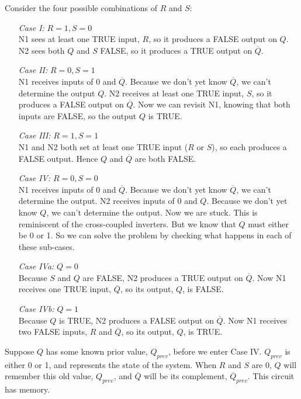 \documentclass[12pt]{article}
\theoremstyle{definition}
\begin{document}
  Consider the four possible combinations of $R$ and $S$:
  \begin{itemize}
    \item[\emph{Case I:}] $R = 1, S = 0$ \\
    N1 sees at least one TRUE input, $R$, so it produces a FALSE output on $Q$. N2 sees both $Q$ and $S$ FALSE, so it produces a TRUE output on $\overline{Q}$.
    \item[\emph{Case II:}] $R = 0, S = 1$ \\
    N1 receives inputs of 0 and $\overline{Q}$. Because we don't yet know $\overline{Q}$, we can't determine the output $Q$. N2 receives at least one TRUE input, $S$, so it produces a FALSE output on $\overline{Q}$. Now we can revisit N1, knowing that both inputs are FALSE, so the output $Q$ is TRUE.
    \item[\emph{Case III:}] $R = 1, S = 1$ \\
    N1 and N2 both set at least one TRUE input ($R$ or $S$), so each produces a FALSE output. Hence $Q$ and $\overline{Q}$ are both FALSE.
    \item[\emph{Case IV:}] $R = 0, S = 0$ \\
    N1 receives inputs of 0 and $\overline{Q}$. Because we don't yet know $\overline{Q}$, we can't determine the output. N2 receives inputs of 0 and $Q$. Because we don't yet know $Q$, we can't determine the output. Now we are stuck. This is reminiscent of the cross-coupled inverters. But we know that $Q$ must either be 0 or 1. So we can solve the problem by checking what happens in each of these sub-cases.
    \item[\emph{Case IVa:}] $Q = 0$ \\
    Because $S$ and $Q$ are FALSE, N2 produces a TRUE output on $\overline{Q}$. Now N1 receives one TRUE input, $\overline{Q}$, so its output, $Q$, is FALSE.
    \item[\emph{Case IVb:}] $Q = 1$ \\
    Because $Q$ is TRUE, N2 produces a FALSE output on $\overline{Q}$. Now N1 receives two FALSE inputs, $R$ and $\overline{Q}$, so its output, $Q$, is TRUE.
  \end{itemize}

  Suppose $Q$ has some known prior value, $Q_{prev}$, before we enter Case IV. $Q_{prev}$ is either 0 or 1, and represents the state of the system.
  When $R$ and $S$ are 0, $Q$ will remember this old value, $Q_{prev}$, and $\overline{Q}$ will be its complement, $\overline{Q}_{prev}$.
  This circuit has memory. \\
\end{document}
